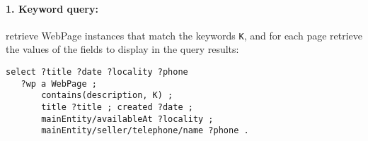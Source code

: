 \paragraph{1. Keyword query:} retrieve WebPage instances that match the keywords \verb|K|, and for each page retrieve the values of the fields to display in the query results:
{\footnotesize
\begin{verbatim}
select ?title ?date ?locality ?phone
   ?wp a WebPage ; 
       contains(description, K) ;   
       title ?title ; created ?date ;
       mainEntity/availableAt ?locality ;
       mainEntity/seller/telephone/name ?phone .
\end{verbatim}
}

